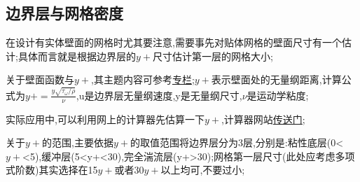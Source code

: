 \subsection{边界层与网格密度}
在设计有实体壁面的网格时尤其要注意,需要事先对贴体网格的壁面尺寸有一个估计;具体而言就是根据边界层的$y+$尺寸估计第一层的网格大小;\par

关于壁面函数与$y+$,其主题内容可参考\href{https://zhuanlan.zhihu.com/p/584913137}{专栏};$y+$表示壁面处的无量纲距离,计算公式为$y+=\frac{y\sqrt{\tau_\omega/\rho}}{\nu}$,u是边界层无量纲速度,y是无量纲尺寸,$\nu$是运动学粘度;\par

实际应用中,可以利用网上的计算器先估算一下$y+$,计算器网站\href{https://www.cfd-online.com/Tools/yplus.php#opennewwidow}{传送门};\par

关于$y+$的范围,主要依据$y+$的取值范围将边界层分为3层,分别是:粘性底层(0<$y+$<5),缓冲层(5<y+<30),完全湍流层(y+>30);网格第一层尺寸(此处应考虑多项式阶数)其实选择在15$y+$或者30$y+$以上均可,不要过小;




